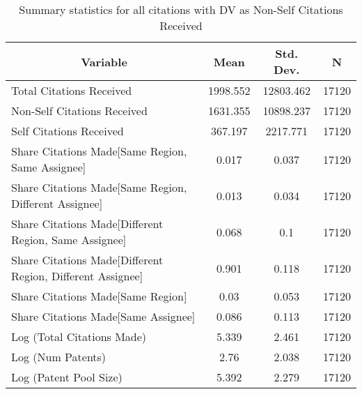 
\begin{table}[htbp]\centering \caption{Summary statistics for all citations with DV as Non-Self Citations Received \label{a.e.o.t.n.nsummary}}
\scriptsize
\singlespacing
\begin{tabular}{l c c  c}\hline\hline
\multicolumn{1}{c}{\textbf{Variable}} & \textbf{Mean}
 & \textbf{Std. Dev.} & \textbf{N}\\ \hline
Total Citations Received & 1998.552 & 12803.462  & 17120\\
Non-Self Citations Received & 1631.355 & 10898.237  & 17120\\
Self Citations Received & 367.197 & 2217.771  & 17120\\
Share Citations Made[Same Region, Same Assignee] & 0.017 & 0.037  & 17120\\
Share Citations Made[Same Region, Different Assignee] & 0.013 & 0.034  & 17120\\
Share Citations Made[Different Region, Same Assignee] & 0.068 & 0.1  & 17120\\
Share Citations Made[Different Region, Different Assignee] & 0.901 & 0.118  & 17120\\
Share Citations Made[Same Region] & 0.03 & 0.053  & 17120\\
Share Citations Made[Same Assignee] & 0.086 & 0.113  & 17120\\
Log (Total Citations Made) & 5.339 & 2.461  & 17120\\
Log (Num Patents) & 2.76 & 2.038  & 17120\\
Log (Patent Pool Size) & 5.392 & 2.279  & 17120\\
\hline\end{tabular}
\end{table}
